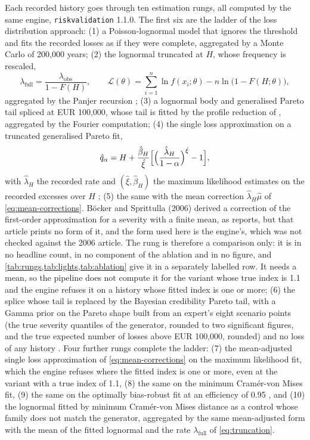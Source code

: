 Each recorded history goes through ten estimation rungs, all computed by the same engine, \texttt{riskvalidation} 1.1.0. The first six are the ladder of the loss distribution approach: (1) a Poisson-lognormal model that ignores the threshold and fits the recorded losses as if they were complete, aggregated by a Monte Carlo of 200,000 years; (2) the lognormal truncated at $H$, whose frequency is rescaled,
\begin{equation}
\lambda_{\mathrm{full}}=\frac{\lambda_{\mathrm{obs}}}{1-F(H)},\qquad \mathcal{L}(\theta)=\sum_{i=1}^{n}\ln f(x_i;\theta)-n\ln\bigl(1-F(H;\theta)\bigr),
\label{eq:truncation}
\end{equation}
aggregated by the Panjer recursion \citep{mignola2007,cope2009}; (3) a lognormal body and generalised Pareto tail spliced at EUR 100,000, whose tail is fitted by the profile reduction of \citet{grimshaw1993}, aggregated by the Fourier computation; (4) the single loss approximation on a truncated generalised Pareto fit,
\begin{equation}
\hat q_\alpha=H+\frac{\hat\beta_H}{\hat\xi}\Bigl[\Bigl(\frac{\hat\lambda_H}{1-\alpha}\Bigr)^{\hat\xi}-1\Bigr],
\label{eq:sla}
\end{equation}
with $\hat\lambda_H$ the recorded rate and $(\hat\xi,\hat\beta_H)$ the maximum likelihood estimates on the recorded excesses over $H$ \citep{embrechts1997,degen2010}; (5) the same with the mean correction $\hat\lambda_H\hat\mu$ of \cref{eq:mean-corrections}. B\"ocker and Sprittulla (2006) derived a correction of the first-order approximation for a severity with a finite mean, as \citet{shevchenko2010} reports, but that article prints no form of it, and the form used here is the engine's, which was not checked against the 2006 article. The rung is therefore a comparison only: it is in no headline count, in no component of the ablation and in no figure, and \cref{tab:rungs,tab:lights,tab:ablation} give it in a separately labelled row. It needs a mean, so the pipeline does not compute it for the variant whose true index is 1.1 and the engine refuses it on a history whose fitted index is one or more;
(6) the splice whose tail is replaced by the Bayesian credibility Pareto tail, with a Gamma prior on the Pareto shape built from an expert's eight scenario points (the true severity quantiles of the generator, rounded to two significant figures, and the true expected number of losses above EUR 100{,}000, rounded) and no loss of any history \citep{shevchenko2006,shevchenko2011}. Four further rungs complete the ladder: (7) the mean-adjusted single loss approximation of \cref{eq:mean-corrections} on the maximum likelihood fit, which the engine refuses where the fitted index is one or more, even at the variant with a true index of 1.1, (8) the same on the minimum Cram\'er-von Mises fit, (9) the same on the optimally bias-robust fit at an efficiency of 0.95 \citep{opdyke2012,hampel1986}, and (10) the lognormal fitted by minimum Cram\'er-von Mises distance as a control whose family does not match the generator, aggregated by the same mean-adjusted form with the mean of the fitted lognormal and the rate $\lambda_{\mathrm{full}}$ of \cref{eq:truncation}.
